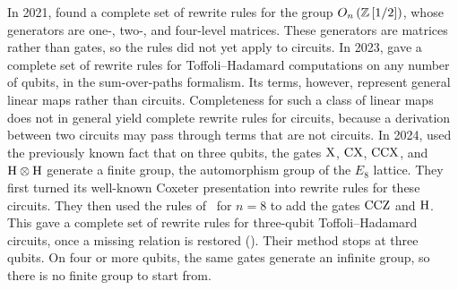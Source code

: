\documentclass[acmsmall,screen,nonacm]{acmart}
\begin{document}
In 2021, \citet{li2021on} found a complete set of rewrite rules for the group $O_n\left(\mathbb{Z}\left[1/2\right]\right)$, whose generators are one-, two-, and four-level matrices. These generators are matrices rather than gates, so the rules did not yet apply to circuits. In 2023, \citet{vilmart2023completeness} gave a complete set of rewrite rules for Toffoli--Hadamard computations on any number of qubits, in the sum-over-paths formalism. Its terms, however, represent general linear maps rather than circuits. Completeness for such a class of linear maps does not in general yield complete rewrite rules for circuits, because a derivation between two circuits may pass through terms that are not circuits. In 2024, \citet{amy2024toffoli} used the previously known fact that on three qubits, the gates $\mathrm{X}$, $\mathrm{CX}$, $\mathrm{CCX}$, and $\mathrm{H}\otimes\mathrm{H}$ generate a finite group, the automorphism group of the $E_8$ lattice. They first turned its well-known Coxeter presentation into rewrite rules for these circuits. They then used the rules of~\citet{li2021on} for $n=8$ to add the gates $\mathrm{CCZ}$ and $\mathrm{H}$. This gave a complete set of rewrite rules for three-qubit Toffoli--Hadamard circuits, once a missing relation is restored (). Their method stops at three qubits. On four or more qubits, the same gates generate an infinite group, so there is no finite group to start from. 
\end{document}
